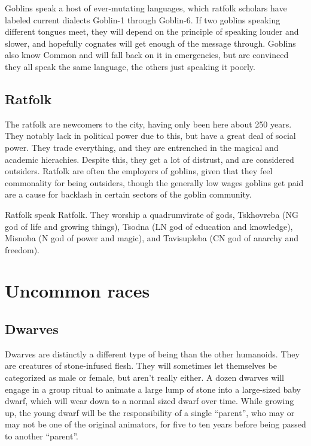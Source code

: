 \documentclass{report}
\begin{document}
Goblins speak a host of ever-mutating languages, which ratfolk scholars have
labeled current dialects Goblin-1 through Goblin-6. If two goblins speaking
different tongues meet, they will depend on the principle of speaking louder and
slower, and hopefully cognates will get enough of the message through. Goblins
also know Common and will fall back on it in emergencies, but are convinced
they all speak the same language, the others just speaking it poorly.

\subsection{Ratfolk}

The ratfolk are newcomers to the city, having only been here about 250 years.
They notably lack in political power due to this, but have a great deal of social
power. They trade everything, and they are entrenched in the magical and academic
hierachies. Despite this, they get a lot of distrust, and are considered outsiders.
Ratfolk are often the employers of goblins, given that they feel commonality for
being outsiders, though the generally low wages goblins get paid are a cause for
backlash in certain sectors of the goblin community.

Ratfolk speak Ratfolk. They worship a quadrumvirate of gods, Tskhovreba (NG
god of life and growing things), Tsodna (LN god of education and knowledge),
Misnoba (N god of power and magic), and Tavisupleba (CN god of anarchy and
freedom).

\section {Uncommon races}

\subsection{Dwarves}

Dwarves are distinctly a different type of being than the other humanoids. They
are creatures of stone-infused flesh. They will sometimes let themselves be categorized
as male or female, but aren't really either. A dozen dwarves will engage in a group
ritual to animate a large lump of stone into a large-sized baby dwarf, which will
wear down to a normal sized dwarf over time. While growing up, the young dwarf
will be the responsibility of a single ``parent'', who may or may not be one of
the original animators, for five to ten years before being passed to another
``parent''.
\end{document}
